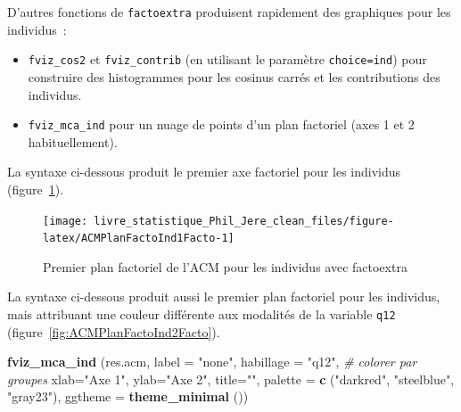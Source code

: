 \documentclass[
  11pt,
  french,
]{book}
\makeatletter
\newenvironment{Shaded}{\begin{snugshade}}{\end{snugshade}}
\newcommand{\CommentTok}[1]{\textcolor[rgb]{0.56,0.35,0.01}{\textit{#1}}}
\newcommand{\DataTypeTok}[1]{\textcolor[rgb]{0.13,0.29,0.53}{#1}}
\newcommand{\KeywordTok}[1]{\textcolor[rgb]{0.13,0.29,0.53}{\textbf{#1}}}
\newcommand{\NormalTok}[1]{#1}
\newcommand{\OtherTok}[1]{\textcolor[rgb]{0.56,0.35,0.01}{#1}}
\newcommand{\StringTok}[1]{\textcolor[rgb]{0.31,0.60,0.02}{#1}}
\providecommand{\tightlist}{%
  \setlength{\itemsep}{0pt}\setlength{\parskip}{0pt}}
\newenvironment{kframe}{%
\medskip{}
\setlength{\fboxsep}{.8em}
 \def\at@end@of@kframe{}%
 \ifinner\ifhmode%
  \def\at@end@of@kframe{\end{minipage}}%
  \begin{minipage}{\columnwidth}%
 \fi\fi%
 \def\FrameCommand##1{\hskip\@totalleftmargin \hskip-\fboxsep
 \colorbox{shadecolor}{##1}\hskip-\fboxsep
     \hskip-\linewidth \hskip-\@totalleftmargin \hskip\columnwidth}%
 \MakeFramed {\advance\hsize-\width
   \@totalleftmargin\z@ \linewidth\hsize
   \@setminipage}}%
 {\par\unskip\endMakeFramed%
 \at@end@of@kframe}
\renewenvironment{Shaded}{\begin{kframe}}{\end{kframe}}
\makeatother
\begin{document}
D'autres fonctions de \texttt{factoextra} produisent rapidement des graphiques pour les individus~:

\begin{itemize}
\tightlist
\item
  \texttt{fviz\_cos2} et \texttt{fviz\_contrib} (en utilisant le paramètre \texttt{choice=ind}) pour construire des histogrammes pour les cosinus carrés et les contributions des individus.
\item
  \texttt{fviz\_mca\_ind} pour un nuage de points d'un plan factoriel (axes 1 et 2 habituellement).
\end{itemize}

La syntaxe ci-dessous produit le premier axe factoriel pour les individus (figure~\ref{fig:ACMPlanFactoInd1Facto}).

\begin{Shaded}
\end{Shaded}

\begin{figure}

{\centering \texttt{[image: livre\_statistique\_Phil\_Jere\_clean\_files/figure-latex/ACMPlanFactoInd1Facto-1]} 

}

\caption{Premier plan factoriel de l'ACM pour les individus avec factoextra}\label{fig:ACMPlanFactoInd1Facto}
\end{figure}

La syntaxe ci-dessous produit aussi le premier plan factoriel pour les individus, mais attribuant une couleur différente aux modalités de la variable \texttt{q12} (figure~\ref{fig:ACMPlanFactoInd2Facto}).

\begin{Shaded}
\begin{Highlighting}[]
\KeywordTok{fviz_mca_ind}\NormalTok{ (res.acm,}
              \DataTypeTok{label =} \StringTok{"none"}\NormalTok{,}
              \DataTypeTok{habillage =} \StringTok{"q12"}\NormalTok{, }\CommentTok{# colorer par groupes}
             \DataTypeTok{xlab=}\StringTok{"Axe 1"}\NormalTok{, }\DataTypeTok{ylab=}\StringTok{"Axe 2"}\NormalTok{, }\DataTypeTok{title=}\StringTok{""}\NormalTok{,}
              \DataTypeTok{palette =} \KeywordTok{c}\NormalTok{ (}\StringTok{"darkred"}\NormalTok{, }\StringTok{"steelblue"}\NormalTok{, }\StringTok{"gray23"}\NormalTok{),}
              \DataTypeTok{ggtheme =} \KeywordTok{theme_minimal}\NormalTok{ ())}
\end{Highlighting}
\end{Shaded}
\end{document}

